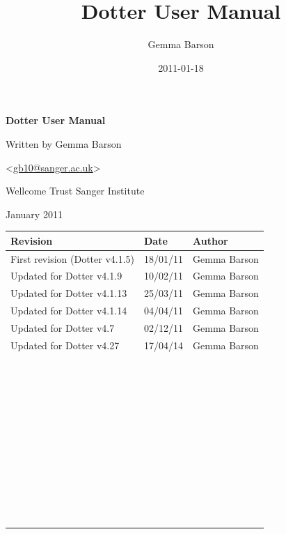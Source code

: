 \documentclass[letterpaper]{article}
\title{Dotter User Manual}
\author{Gemma Barson}
\date{2011-01-18}
\begin{document}
\setcounter{page}{1}\pagestyle{Standard}

\thispagestyle{FirstPage}
{\centering\sffamily\bfseries\color[rgb]{0.0,0.27058825,0.5254902}
\Huge\bf{Dotter User Manual}
\par}

\bigskip

{\centering
\large{Written by Gemma Barson}
\par}
{\centering
{\textless}\href{mailto:gb10@sanger.ac.uk}{gb10@sanger.ac.uk}{\textgreater}
\par}

\bigskip

{\centering
\large{Wellcome Trust Sanger Institute}
\par}
{ January 2011
\par}




\begin{center}
\tablehead{}
\begin{supertabular}{|m{8.073cm}|m{3.2849998cm}|m{3.282cm}|}
\hline
\bfseries Revision &
\bfseries Date &
\bfseries Author\\\hline
 First revision (Dotter v4.1.5) &
 18/01/11 &
 Gemma Barson\\\hline
 Updated for Dotter v4.1.9 &
 10/02/11 &
 Gemma Barson\\\hline
 Updated for Dotter v4.1.13 &
 25/03/11 &
 Gemma Barson\\\hline
 Updated for Dotter v4.1.14 &
 04/04/11 &
 Gemma Barson\\\hline
 Updated for Dotter v4.7 &
 02/12/11 &
 Gemma Barson\\\hline
Updated for Dotter v4.27 &
 17/04/14 &
 Gemma Barson\\\hline
~
 &
~
 &
~
\\\hline
~
 &
~
 &
~
\\\hline
~
 &
~
 &
~
\\\hline
~
 &
~
 &
~
\\\hline
~
 &
~
 &
~
\\\hline
~
 &
~
 &
~
\\\hline
~
 &
~
 &
~
\\\hline
~
 &
~
 &
~
\\\hline
~
 &
~
 &
~
\\\hline
~
 &
~
 &
~
\\\hline
\end{supertabular}
\end{center}
\end{document}
